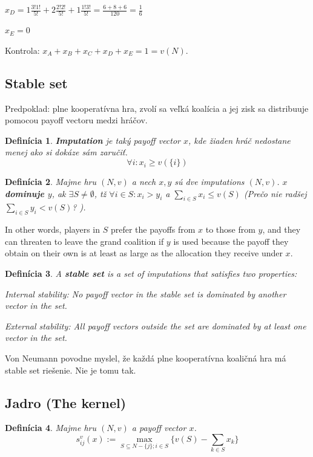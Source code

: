 \documentclass[a5paper,12pt]{article}
\newtheorem*{mydef}{Defin\'icia}
\begin{document}
      $x_{D} = 1 \frac{3!1!}{5!} + 2 \frac{2!2!}{5!} + 1 \frac{1!3!}{5!}= \frac{6+8+6}{120} = \frac{1}{6}$

      $x_{E} = 0$

      Kontrola: $x_{A}+x_{B}+x_{C}+x_{D}+x_{E}=1=v(N)$.
      
    \subsection{Stable set}
      Predpoklad: plne kooperat\'ivna hra, zvol\'i sa ve\v{l}k\'a koal\'icia a jej zisk sa distribuuje pomocou payoff vectoru medzi hr\'a\v{c}ov.
       
      \begin{mydef}
      {\bf Imputation} je tak\'y payoff vector $x$, kde \v{z}iaden hr\'a\v{c} nedostane menej ako si dok\'aze s\'am zaru\v{c}i\v{t}. 
      \[ \forall i:x_{i} \geq v(\{i\})\]
      \end{mydef}


      \begin{mydef}
      Majme hru $(N,v)$ a nech $x,y$ s\'u dve imputations $(N,v)$. {\bf $x$ dominuje $y$}, ak $\exists S \neq \emptyset$, t\v{z} $\forall i \in S :x_{i} > y_{i}$ a $\sum_{i \in S} x_{i} \leq v(S)$ (Pre\v{c}o nie rad\v{s}ej  $\sum_{i \in S} y_{i} < v(S)$? ).	
      \end{mydef}

      In other words, players in $S$ prefer the payoffs from $x$ to those from $y$, and they can threaten to leave the grand coalition if $y$ is used because the payoff they obtain on their own is at least as large as the allocation they receive under $x$. 

      \begin{mydef}
      A {\bf stable set} is a set of imputations that satisfies two properties:

      Internal stability: No payoff vector in the stable set is dominated by another vector in the set.

      External stability: All payoff vectors outside the set are dominated by at least one vector in the set.
      \end{mydef}

      Von Neumann povodne myslel, \v{z}e ka\v{z}d\'a plne kooperat\'ivna koali\v{c}n\'a hra m\'a stable set rie\v{s}enie. Nie je tomu tak.
      
    \subsection{Jadro (The kernel)}
      \begin{mydef}
      Majme hru $(N,v)$ a payoff vector $x$.
      \[s_{ij}^{v}(x):=\max_{S \subseteq N-\{j\}; i \in S}\{v(S) - \sum_{k \in S}x_{k}\}\]
      \end{mydef}
\end{document}
